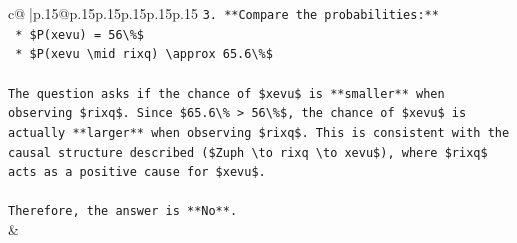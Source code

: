 \documentclass{article}
\begin{document}
{\begin{supertabular}{c@{$\;$}|p{.15\linewidth}@{}p{.15\linewidth}p{.15\linewidth}p{.15\linewidth}p{.15\linewidth}p{.15\linewidth}}
{{{\texttt{3.  **Compare the probabilities:**} \\
\texttt{    *   \$P(xevu) = 56\textbackslash{}\%\$} \\
\texttt{    *   \$P(xevu \textbackslash{}mid rixq) \textbackslash{}approx 65.6\textbackslash{}\%\$} \\
\\ 
\texttt{The question asks if the chance of \$xevu\$ is **smaller** when observing \$rixq\$. Since \$65.6\textbackslash{}\% > 56\textbackslash{}\%\$, the chance of \$xevu\$ is actually **larger** when observing \$rixq\$. This is consistent with the causal structure described (\$Zuph \textbackslash{}to rixq \textbackslash{}to xevu\$), where \$rixq\$ acts as a positive cause for \$xevu\$.} \\
\\ 
\texttt{Therefore, the answer is **No**.} \\
            }
        }
    }
    & \\ \\


\end{supertabular}}
\end{document}
